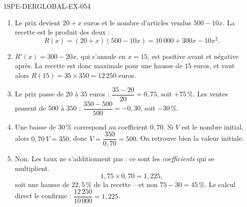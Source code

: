 \begin{corrige}{1SPE-DERGLOBAL-EX-054}
\begin{enumerate}
\item Le prix devient $20 + x$ euros et le nombre d'articles vendus
  $500 - 10x$. La recette est le produit des deux :
  \[
    R(x) = (20+x)(500-10x) = 10\,000 + 300x - 10x^2 .
  \]

\item $R'(x) = 300 - 20x$, qui s'annule en $x = 15$, est positive avant et
  négative après. La recette est donc maximale pour une hausse de $15$ euros,
  et vaut alors $R(15) = 35 \times 350 = 12\,250$ euros.

\item Le prix passe de $20$ à $35$ euros :
  $\dfrac{35-20}{20} = 0{,}75$, soit $+75\,\%$.
  Les ventes passent de $500$ à $350$ :
  $\dfrac{350-500}{500} = -0{,}30$, soit $-30\,\%$.

\item Une baisse de $30\,\%$ correspond au coefficient $0{,}70$. Si $V$ est
  le nombre initial, alors $0{,}70\,V = 350$, donc
  $V = \dfrac{350}{0{,}70} = 500$. On retrouve bien la valeur initiale.

\item Non. Les taux ne s'additionnent pas : ce sont les \emph{coefficients}
  qui se multiplient.
  \[
    1{,}75 \times 0{,}70 = 1{,}225,
  \]
  soit une hausse de $22{,}5\,\%$ de la recette -- et non
  $75 - 30 = 45\,\%$. Le calcul direct le confirme :
  $\dfrac{12\,250}{10\,000} = 1{,}225$.
\end{enumerate}
\end{corrige}
